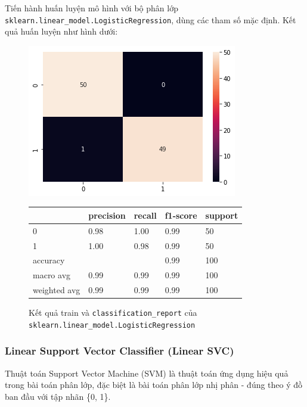 \documentclass[12pt]{article}
\begin{document}
Tiến hành huấn luyện mô hình với bộ phân lớp \texttt{sklearn.linear\_model.LogisticRegression}, dùng các tham số mặc định. Kết quả huấn luyện như hình dưới:
\begin{figure}[H]
	\begin{multicols}{2}
		\includegraphics[scale=.5]{img/train-lr-result.png}

		\begin{table}[H]
			\begin{tabular}{l l l l l}
				\hline
				& precision & recall & f1-score & support \\
				\hline
				0 & 0.98 & 1.00 & 0.99 & 50 \\
				1 & 1.00 & 0.98 & 0.99 & 50 \\
				accuracy &   &   & 0.99 & 100 \\
				macro avg & 0.99 & 0.99 & 0.99 & 100 \\
				weighted avg & 0.99 & 0.99 & 0.99 & 100 \\
				\hline
			\end{tabular}
		\end{table}
	\end{multicols}
	\caption{Kết quả train và \texttt{classification\_report} của \texttt{sklearn.linear\_model.LogisticRegression}}
\end{figure}

\subsubsection{Linear Support Vector Classifier (Linear SVC)}
Thuật toán Support Vector Machine (SVM) là thuật toán ứng dụng hiệu quả trong bài toán phân lớp, đặc biệt là bài toán phân lớp nhị phân - đúng theo ý đồ ban đầu với tập nhãn \{0, 1\}.
\end{document}
